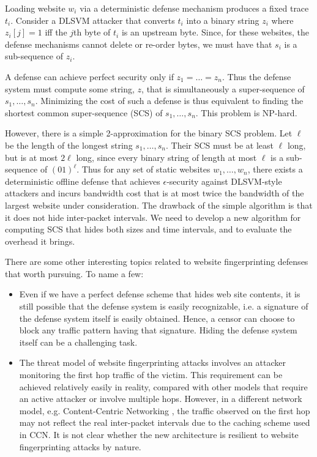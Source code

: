 \documentclass[11pt,oneside]{article}
\begin{document}
Loading website $w_i$ via a deterministic defense mechanism produces a
fixed trace $t_i$.  Consider a DLSVM attacker that converts $t_i$ into
a binary string $z_i$ where $z_i[j]=1$ iff the $j$th byte of $t_i$ is
an upstream byte.  Since, for these websites, the defense mechanisms
cannot delete or re-order bytes, we must have that $s_i$ is a
sub-sequence of $z_i$.

A defense can achieve perfect security only if $z_1=\dots=z_n$.  Thus
the defense system must compute some string, $z$, that is
simultaneously a super-sequence of $s_1,\dots,s_n$.  Minimizing the
cost of such a defense is thus equivalent to finding the
shortest common super-sequence (SCS) of $s_1, \dots, s_n$.
This problem is NP-hard\cite{SCS_SR8}.

However, there is a simple 2-approximation for the binary SCS problem.
Let $\ell$ be the length of the longest string $s_1,\dots,s_n$.  Their
SCS must be at least $\ell$ long, but is at most $2\ell$ long, since
every binary string of length at most $\ell$ is a sub-sequence of
$(01)^\ell$.  Thus for any set of static websites $w_1,\dots,w_n$,
there exists a deterministic offline defense that achieves $\epsilon$-security against DLSVM-style attackers and
incurs bandwidth cost that is at most twice the bandwidth of the largest website under consideration. The drawback of the simple algorithm is that it does not hide inter-packet intervals. We need to develop a new algorithm for computing SCS that hides both sizes and time intervals, and to evaluate the overhead it brings.

There are some other interesting topics related to website fingerprinting defenses that worth pursuing. To name a few:

\begin{itemize}

\item
Even if we have a perfect defense scheme that hides web site contents, it is still possible that the defense system is easily recognizable, i.e. a signature of the defense system itself is easily obtained. Hence, a censor can choose to block any traffic pattern having that signature. Hiding the defense system itself can be a challenging task.

\item
The threat model of website fingerprinting attacks involves an attacker monitoring the first hop traffic of the victim. This requirement can be achieved relatively easily in reality, compared with other models that require an active attacker or involve multiple hops. However, in a different network model, e.g. Content-Centric Networking \cite{jacobson-CoNEXT09}, the traffic observed on the first hop may not reflect the real inter-packet intervals due to the caching scheme used in CCN. It is not clear whether the new architecture is resilient to website fingerprinting attacks by nature.

\end{itemize} 



\end{document}
